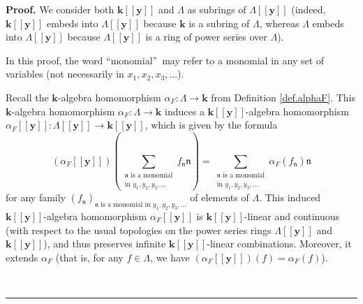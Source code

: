\documentclass[numbers=enddot,12pt,final,onecolumn,notitlepage]{scrartcl}%
\theoremstyle{definition}
\newenvironment{proof}[1][Proof]{\noindent\textbf{#1.} }{\ \rule{0.5em}{0.5em}}
\let\sumnonlimits\sum
\renewcommand{\sum}{\sumnonlimits\limits}
\newenvironment{verlong}{}{}
\begin{document}
\begin{verlong}
\begin{proof}
We consider both $\mathbf{k}\left[  \left[  \mathbf{y}\right]  \right]  $ and
$\Lambda$ as subrings of $\Lambda\left[  \left[  \mathbf{y}\right]  \right]  $
(indeed, $\mathbf{k}\left[  \left[  \mathbf{y}\right]  \right]  $ embeds into
$\Lambda\left[  \left[  \mathbf{y}\right]  \right]  $ because $\mathbf{k}$ is
a subring of $\Lambda$, whereas $\Lambda$ embeds into $\Lambda\left[  \left[
\mathbf{y}\right]  \right]  $ because $\Lambda\left[  \left[  \mathbf{y}%
\right]  \right]  $ is a ring of power series over $\Lambda$).

In this proof, the word \textquotedblleft monomial\textquotedblright\ may
refer to a monomial in any set of variables (not necessarily in $x_{1}%
,x_{2},x_{3},\ldots$).

Recall the $\mathbf{k}$-algebra homomorphism $\alpha_{F}:\Lambda
\rightarrow\mathbf{k}$ from Definition \ref{def.alphaF}. This $\mathbf{k}%
$-algebra homomorphism $\alpha_{F}:\Lambda\rightarrow\mathbf{k}$ induces a
$\mathbf{k}\left[  \left[  \mathbf{y}\right]  \right]  $-algebra homomorphism
$\alpha_{F}\left[  \left[  \mathbf{y}\right]  \right]  :\Lambda\left[  \left[
\mathbf{y}\right]  \right]  \rightarrow\mathbf{k}\left[  \left[
\mathbf{y}\right]  \right]  $, which is given by the formula%
\[
\left(  \alpha_{F}\left[  \left[  \mathbf{y}\right]  \right]  \right)  \left(
\sum_{\substack{\mathfrak{n}\text{ is a monomial}\\\text{in }y_{1},y_{2}%
,y_{3},\ldots}}f_{\mathfrak{n}}\mathfrak{n}\right)  =\sum
_{\substack{\mathfrak{n}\text{ is a monomial}\\\text{in }y_{1},y_{2}%
,y_{3},\ldots}}\alpha_{F}\left(  f_{\mathfrak{n}}\right)  \mathfrak{n}%
\]
for any family $\left(  f_{\mathfrak{n}}\right)  _{\mathfrak{n}\text{ is a
monomial in }y_{1},y_{2},y_{3},\ldots}$ of elements of $\Lambda$. This induced
$\mathbf{k}\left[  \left[  \mathbf{y}\right]  \right]  $-algebra homomorphism
$\alpha_{F}\left[  \left[  \mathbf{y}\right]  \right]  $ is $\mathbf{k}\left[
\left[  \mathbf{y}\right]  \right]  $-linear and continuous (with respect to
the usual topologies on the power series rings $\Lambda\left[  \left[
\mathbf{y}\right]  \right]  $ and $\mathbf{k}\left[  \left[  \mathbf{y}%
\right]  \right]  $), and thus preserves infinite $\mathbf{k}\left[  \left[
\mathbf{y}\right]  \right]  $-linear combinations. Moreover, it extends
$\alpha_{F}$ (that is, for any $f\in\Lambda$, we have $\left(  \alpha
_{F}\left[  \left[  \mathbf{y}\right]  \right]  \right)  \left(  f\right)
=\alpha_{F}\left(  f\right)  $).


\end{proof}
\end{verlong}
\end{document}
